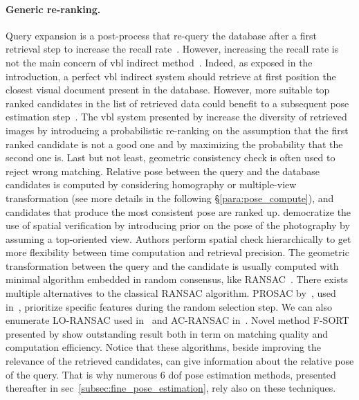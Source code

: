 \paragraph{Generic re-ranking.}    
Query expansion is a post-process that re-query the database after a first retrieval step to increase the recall rate~\citep{Chum2007,Chum2011,Tolias2014}. However, increasing the recall rate is not the main concern of \ac{vbl} indirect method~\citep{Sattler2012}. Indeed, as exposed in the introduction, a perfect \ac{vbl} indirect system should retrieve at first position the closest visual document present in the database. However, more suitable top ranked candidates in the list of retrieved data could benefit to a subsequent pose estimation step~\citep{Song2016}. The \ac{vbl} system presented by \citet{Cao2013} increase the diversity of retrieved images by introducing a probabilistic re-ranking on the assumption that the first ranked candidate is not a good one and by maximizing the probability that the second one is.
\label{par:ransac}
Last but not least, geometric consistency check is often used to reject wrong matching. Relative pose between the query and the database candidates is computed by considering homography or multiple-view transformation (see more details in the following \S\ref{para:pose_compute}), and candidates that produce the most consistent pose are ranked up. \citet{Philbin2007} democratize the use of spatial verification by introducing prior on the pose of the photography by assuming a top-oriented view. Authors perform spatial check hierarchically to get more flexibility between time computation and retrieval precision. The geometric transformation between the query and the candidate is usually computed with minimal algorithm embedded in random consensus, like RANSAC~\citep{Fischler1981}. There exists multiple alternatives to the classical RANSAC algorithm. PROSAC by~\citep{Chum2005}, used in~\citep{Donoser2014}, prioritize specific features during the random selection step. We can also enumerate LO-RANSAC used in~\citep{Philbin2007} and AC-RANSAC in~\citep{Qu2015,Qu2016}. Novel method F-SORT presented by \citet{Chan2016} show outstanding result both in term on matching quality and computation efficiency. Notice that these algorithms, beside improving the relevance of the retrieved candidates, can give information about the relative pose of the query. That is why numerous 6 \ac{dof} pose estimation methods, presented thereafter in \acs{sec}~\ref{subsec:fine_pose_estimation}, rely also on these techniques.

